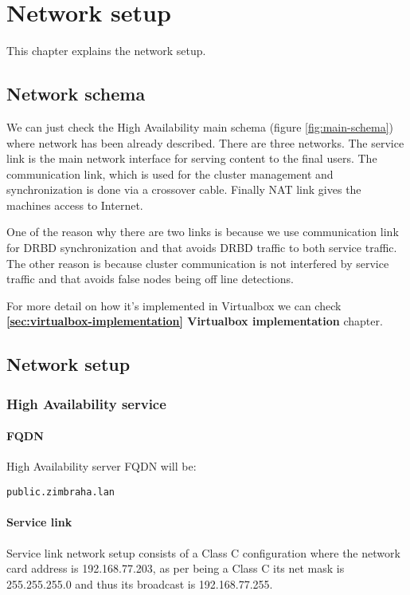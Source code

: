 

\chapter{Network setup}
\label{chap:network-setup}
This chapter explains the network setup.

\section {Network schema}
We can just check the High Availability main schema (figure \ref{fig:main-schema}) where network has been already described. There are three networks. The service link is the main network interface for serving content to the final users. The communication link, which is used for the cluster management and synchronization is done via a crossover cable. Finally NAT link gives the machines access to Internet.

One of the reason why there are two links is because we use communication link for DRBD synchronization and that avoids DRBD traffic to both service traffic. The other reason is because cluster communication is not interfered by service traffic and that avoids false nodes being off line detections.

For more detail on how it's implemented in Virtualbox we can check \textbf{\ref{sec:virtualbox-implementation} Virtualbox implementation} chapter.

\section {Network setup}

\subsection {High Availability service}
\subsubsection {FQDN}
High Availability server FQDN will be:
\begin{verbatim}
public.zimbraha.lan
\end{verbatim}

\subsubsection {Service link}
Service link network setup consists of a Class C configuration where the network card address is 192.168.77.203, as per being a Class C its net mask is 255.255.255.0 and thus its broadcast is 192.168.77.255.

